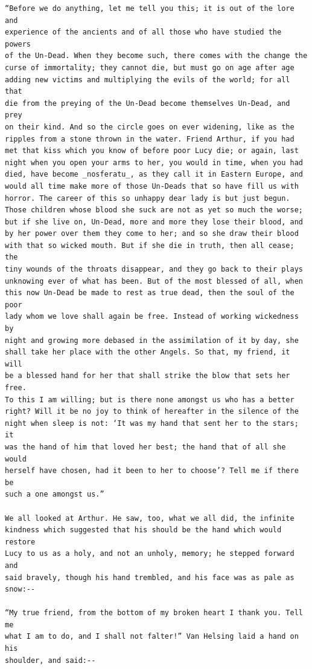 \documentclass{article}
\begin{document}
\begin{verbatim}
“Before we do anything, let me tell you this; it is out of the lore and
experience of the ancients and of all those who have studied the powers
of the Un-Dead. When they become such, there comes with the change the
curse of immortality; they cannot die, but must go on age after age
adding new victims and multiplying the evils of the world; for all that
die from the preying of the Un-Dead become themselves Un-Dead, and prey
on their kind. And so the circle goes on ever widening, like as the
ripples from a stone thrown in the water. Friend Arthur, if you had
met that kiss which you know of before poor Lucy die; or again, last
night when you open your arms to her, you would in time, when you had
died, have become _nosferatu_, as they call it in Eastern Europe, and
would all time make more of those Un-Deads that so have fill us with
horror. The career of this so unhappy dear lady is but just begun.
Those children whose blood she suck are not as yet so much the worse;
but if she live on, Un-Dead, more and more they lose their blood, and
by her power over them they come to her; and so she draw their blood
with that so wicked mouth. But if she die in truth, then all cease; the
tiny wounds of the throats disappear, and they go back to their plays
unknowing ever of what has been. But of the most blessed of all, when
this now Un-Dead be made to rest as true dead, then the soul of the poor
lady whom we love shall again be free. Instead of working wickedness by
night and growing more debased in the assimilation of it by day, she
shall take her place with the other Angels. So that, my friend, it will
be a blessed hand for her that shall strike the blow that sets her free.
To this I am willing; but is there none amongst us who has a better
right? Will it be no joy to think of hereafter in the silence of the
night when sleep is not: ‘It was my hand that sent her to the stars; it
was the hand of him that loved her best; the hand that of all she would
herself have chosen, had it been to her to choose’? Tell me if there be
such a one amongst us.”

We all looked at Arthur. He saw, too, what we all did, the infinite
kindness which suggested that his should be the hand which would restore
Lucy to us as a holy, and not an unholy, memory; he stepped forward and
said bravely, though his hand trembled, and his face was as pale as
snow:--

“My true friend, from the bottom of my broken heart I thank you. Tell me
what I am to do, and I shall not falter!” Van Helsing laid a hand on his
shoulder, and said:--


\end{verbatim}
\end{document}

